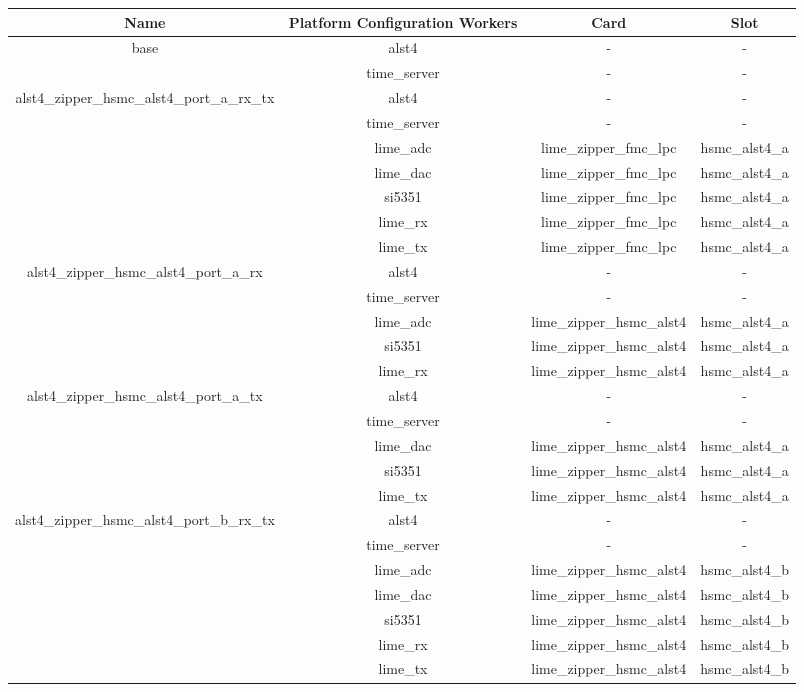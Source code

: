 \documentclass{article}
\def\comp{alst4}
\begin{document}
\begin{tabular}{|c|c|c|c|}
	\hline
	\rowcolor{blue}
	Name & Platform Configuration Workers & Card & Slot \\
	\hline
	\multirow{2}{*}{base} &\comp & - & - \\ &time\_server & - & - \\
	\hline
	\multirow{5}{*}{alst4\_zipper\_hsmc\_alst4\_port\_a\_rx\_tx}&
	\comp & - & - \\ &time\_server & - & -
	\\ &lime\_adc & lime\_zipper\_fmc\_lpc & hsmc\_alst4\_a \\
	&lime\_dac & lime\_zipper\_fmc\_lpc & hsmc\_alst4\_a \\
	&si5351 & lime\_zipper\_fmc\_lpc & hsmc\_alst4\_a \\
	&lime\_rx & lime\_zipper\_fmc\_lpc & hsmc\_alst4\_a \\
	&lime\_tx & lime\_zipper\_fmc\_lpc & hsmc\_alst4\_a \\
	\hline
	\multirow{5}{*}{alst4\_zipper\_hsmc\_alst4\_port\_a\_rx}&
	\comp & - & - \\ &time\_server & - & - \\ &lime\_adc &
	lime\_zipper\_hsmc\_alst4 & hsmc\_alst4\_a \\  &si5351 &
	lime\_zipper\_hsmc\_alst4 & hsmc\_alst4\_a \\ &lime\_rx &
	lime\_zipper\_hsmc\_alst4 & hsmc\_alst4\_a \\
	\hline
	\multirow{5}{*}{alst4\_zipper\_hsmc\_alst4\_port\_a\_tx}&
	\comp & - & - \\ &time\_server & - & - \\ &lime\_dac &
	lime\_zipper\_hsmc\_alst4 & hsmc\_alst4\_a \\  &si5351 &
	lime\_zipper\_hsmc\_alst4 & hsmc\_alst4\_a \\ &lime\_tx &
	lime\_zipper\_hsmc\_alst4 & hsmc\_alst4\_a \\
	\hline
	\multirow{5}{*}{alst4\_zipper\_hsmc\_alst4\_port\_b\_rx\_tx}&
	\comp & - & - \\ &time\_server & - & - \\ &lime\_adc &
	lime\_zipper\_hsmc\_alst4 & hsmc\_alst4\_b \\ &lime\_dac &
	lime\_zipper\_hsmc\_alst4 & hsmc\_alst4\_b \\ &si5351 &
	lime\_zipper\_hsmc\_alst4 & hsmc\_alst4\_b \\ &lime\_rx &
	lime\_zipper\_hsmc\_alst4 & hsmc\_alst4\_b \\ &lime\_tx &
	lime\_zipper\_hsmc\_alst4 & hsmc\_alst4\_b \\

\end{tabular}
\end{document}

